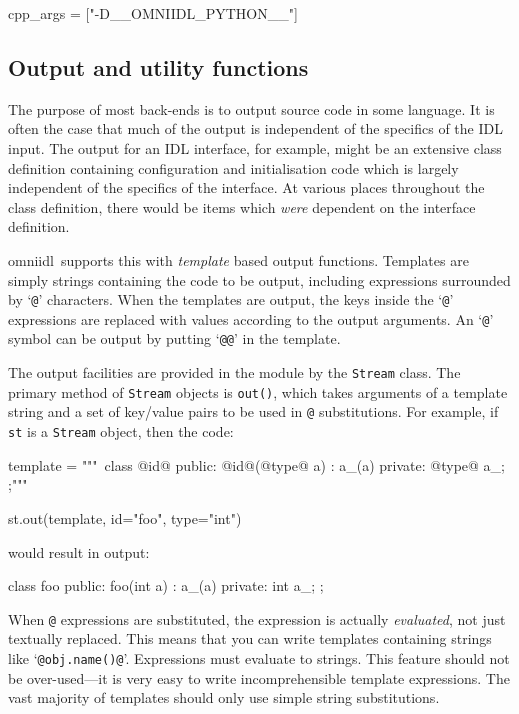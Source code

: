 \documentclass[11pt,twoside,a4paper]{article}
\newcommand{\omniidl}{\textsf{omniidl}}
\newcommand{\func}[1]{\texttt{#1}}
\newcommand{\var}[1]{\texttt{#1}}
\newcommand{\class}[1]{\texttt{#1}}
\newcommand{\file}{\begingroup \urlstyle{tt}\Url}
\begin{document}
\begin{pylisting}
cpp_args = ["-D__OMNIIDL_PYTHON__"]
\end{pylisting}



\subsection{Output and utility functions}

The purpose of most back-ends is to output source code in some
language. It is often the case that much of the output is independent
of the specifics of the IDL input. The output for an IDL interface,
for example, might be an extensive class definition containing
configuration and initialisation code which is largely independent of
the specifics of the interface. At various places throughout the class
definition, there would be items which \emph{were} dependent on the
interface definition.

\omniidl\ supports this with \emph{template} based output functions.
Templates are simply strings containing the code to be output,
including expressions surrounded by `\texttt{@}' characters. When the
templates are output, the keys inside the `\texttt{@}' expressions are
replaced with values according to the output arguments. An
`\texttt{@}' symbol can be output by putting `\texttt{@@}' in the
template.

The output facilities are provided in the \file{omniidl.output} module
by the \class{Stream} class. The primary method of \class{Stream}
objects is \func{out()}, which takes arguments of a template string
and a set of key/value pairs to be used in \texttt{@} substitutions.
For example, if \var{st} is a \class{Stream} object, then the code:

\begin{pylisting}
    template = """\
  class @id@ {
  public:
    @id@(@type@ a) : a_(a) {}
  private:
    @type@ a_;
  };"""

    st.out(template, id="foo", type="int")
\end{pylisting}


\noindent would result in output:

\begin{cxxlisting}
  class foo {
  public:
    foo(int a) : a_(a) {}
  private:
    int a_;
  };
\end{cxxlisting}


When \texttt{@} expressions are substituted, the expression is
actually \emph{evaluated}, not just textually replaced. This means
that you can write templates containing strings like
`\texttt{@obj.name()@}'. Expressions must evaluate to strings. This
feature should not be over-used---it is very easy to write
incomprehensible template expressions. The vast majority of templates
should only use simple string substitutions.
\end{document}
